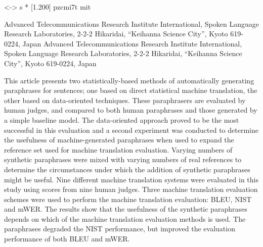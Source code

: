 




             {<-> s * [1.200] pzcmi7t}{}
                                 {m}{it}

\setcounter{page}{1}
\setcounter{巻数}{11}
\setcounter{号数}{5}
\setcounter{年}{2004}
\setcounter{月}{10}

\setcounter{secnumdepth}{2}

\title{}
\author{}
\jkeywords{}




	  {Advanced Telecommunications Research Institute International, Spoken Language Research Laboratories, 2-2-2 Hikaridai, ``Keihanna Science City'', Kyoto 619-0224, Japan}
	  {Advanced Telecommunications Research Institute International, Spoken Language Research Laboratories, 2-2-2 Hikaridai, ``Keihanna Science City'', Kyoto 619-0224, Japan}

\eabstract
{
This article presents two statistically-based methods of 
automatically generating paraphrases for sentences; one based on direct
statistical machine translation, the other based on data-oriented techniques.
These paraphrasers are evaluated by human judges, and compared to both human 
paraphrases and those generated by a simple baseline model. The data-oriented
approach proved to be the most successful in this evaluation and a second
experiment was conducted to determine the usefulness of machine-generated
paraphrases when used to expand the reference set used for machine translation
evaluation. Varying numbers of synthetic paraphrases were mixed with varying numbers of real
references to determine the circumstances under which the addition of synthetic 
paraphrases might be useful. Nine different machine translation systems were evaluated in this
study using scores from nine human judges. Three machine translation evaluation schemes were
used to perform the machine translation evaluation: BLEU, NIST and mWER. 
The results show that the usefulness of the synthetic paraphrases depends on which of
the machine translation evaluation methods is used. The paraphrases degraded the NIST performance,
but improved the evaluation performance of both BLEU and mWER.
}

